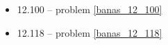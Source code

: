 \begin{multicols}{3}
\begin{itemize}
    \item 12.100 -- problem \ref{banas_12_100}
    \item 12.118 -- problem \ref{banas_12_118}

\end{itemize}
\end{multicols}
